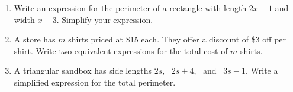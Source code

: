\documentclass[12pt, letterpaper, fleqn]{article}
\begin{document}
\begin{enumerate}[itemsep=2.2cm, leftmargin=0.6cm]

\item Write an expression for the perimeter of a rectangle with length $2x + 1$ and width $x - 3$. Simplify your expression.

\vspace{2.2cm}

\item A store has $m$ shirts priced at \$15 each. They offer a discount of \$3 off per shirt. Write two equivalent expressions for the total cost of $m$ shirts.

\vspace{2.2cm}

\item A triangular sandbox has side lengths $2s$, \ $2s + 4$, \ and \ $3s - 1$. Write a simplified expression for the total perimeter.

\vspace{2.2cm}

\end{enumerate}
\end{document}
